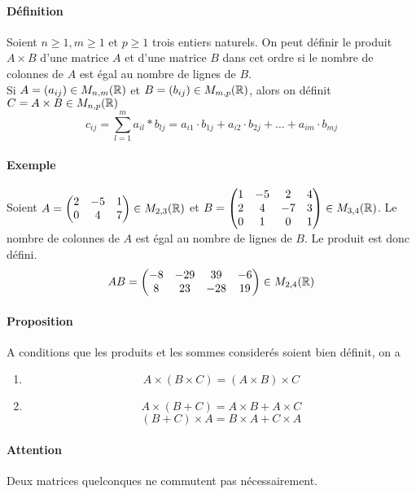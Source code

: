 \paragraph{Définition} Soient $n \geq 1, m \geq 1$ et $p \geq 1$ trois entiers naturels. On peut définir le produit $A \times B$ d'une matrice $A$ et d'une matrice $B$ dans cet ordre si le nombre de colonnes de $A$ est égal au nombre de lignes de $B$. \\
Si $A = (a_{ij}) \in M_{n, m}(\mathbb{R})$ et $B = (b_{ij}) \in M_{m, p}(\mathbb{R})$, alors on définit $C = A \times B \in M_{n, p}(\mathbb{R})$
$$c_{ij} = \sum_{l=1}^{m} a_{il} * b_{lj} = a_{i1} \cdot b_{1j} + a_{i2} \cdot b_{2j} + \ldots + a_{im} \cdot b_{mj}$$

\paragraph{Exemple} Soient $A = 
\begin{pmatrix}
  2 & -5 & 1 \\
  0 & 4 & 7 \\
\end{pmatrix} \in M_{2,3}(\mathbb{R})$ et $B = 
\begin{pmatrix}
  1 & -5 & 2 & 4 \\
  2 & 4 & -7 & 3\\
  0 & 1 & 0 & 1 \\
\end{pmatrix} \in M_{3,4}(\mathbb{R})$. Le nombre de colonnes de $A$ est égal au nombre de lignes de $B$. Le produit est donc défini. 
$$AB = 
\begin{pmatrix}
  -8 & -29 & 39 & -6 \\
  8 & 23 & -28 & 19 \\
\end{pmatrix} \in M_{2,4}(\mathbb{R})$$

\paragraph{Proposition} A conditions que les produits et les sommes considerés soient bien définit, on a
\begin{enumerate}
  \item $$A \times (B \times C) = (A \times B) \times C$$
  \item $$A \times (B + C) = A \times B + A \times C$$ 
    $$(B + C) \times A = B \times A + C \times A$$
\end{enumerate}

\paragraph{Attention} Deux matrices quelconques ne commutent pas nécessairement.
